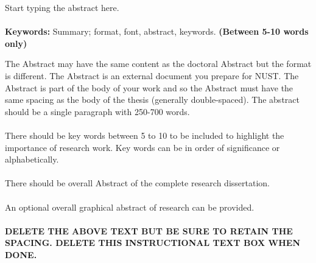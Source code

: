 \documentclass[a4paper,12pt,one side]{report}
\theoremstyle{definition}
\begin{document}
Start typing the abstract here.\\~\\
{\bf Keywords:}	Summary; format, font, abstract, keywords. {\bf (Between 5-10 words only)}
\begin{tcolorbox}[enhanced jigsaw,
    sharp corners,
    boxrule=0.5pt, 
    colback=blue!30!white,   
    borderline={0.5pt}{-2pt}{black,solid} %
 ]
 \begin{justify}
 The Abstract may have the same content as the doctoral Abstract but the format is different. The Abstract is an external document you prepare for NUST. The Abstract is part of the body of your work and so the Abstract must have the same spacing as the body of the thesis (generally double-spaced). The abstract should be a single paragraph with 250-700 words.\\~\\
There should be key words between 5 to 10 to be included to highlight the importance of research work. Key words can be in order of significance or alphabetically.\\~\\
There should be overall Abstract of the complete research dissertation.\\~\\ 
An optional overall graphical abstract of research can be provided.\\~\\
\bf{DELETE THE ABOVE TEXT BUT BE SURE TO RETAIN THE SPACING.}
{\bf DELETE THIS INSTRUCTIONAL TEXT BOX WHEN DONE.}
\end{justify}
\end{tcolorbox}
\pagebreak
\end{document}
